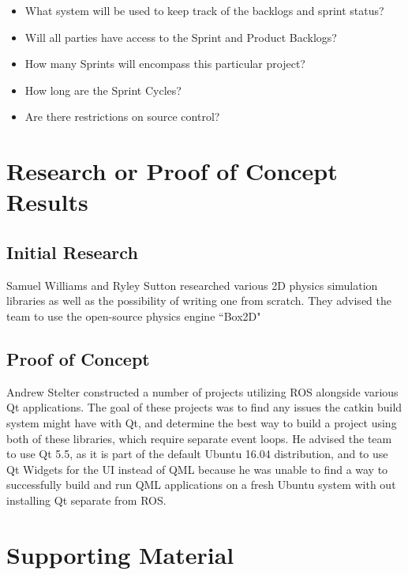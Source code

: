  
\begin{itemize}
\item What system will be used to keep track of the backlogs and sprint status?
\item Will all parties have access to the Sprint and Product Backlogs?
\item How many Sprints will encompass this particular project?
\item How long are the Sprint Cycles?
\item Are there restrictions on source control? 
\end{itemize}


\section{Research or Proof of Concept Results}
\subsection{Initial Research}
Samuel Williams and Ryley Sutton researched various 2D physics simulation libraries as well as the possibility of writing one from scratch. They advised the team to use the open-source physics engine ``Box2D"

\subsection{Proof of Concept}
Andrew Stelter constructed a number of projects utilizing ROS alongside various Qt applications. The goal of these projects was to find any issues the catkin build system might have with Qt, and determine the best way to build a project using both of these libraries, which require separate event loops. He advised the team to use Qt 5.5, as it is part of the default Ubuntu 16.04 distribution, and to use Qt Widgets for the UI instead of QML because he was unable to find a way to successfully build and run QML applications on a fresh Ubuntu system with out installing Qt separate from ROS.

\section{Supporting Material}

